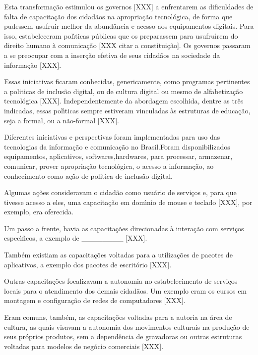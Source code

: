 \documentclass[
12pt,		%
openright,	%
twoside,  %
a4paper,			%
chapter=TITLE,		%
english,			%
french,				%
spanish,			%
brazil				%
]{USPSC-classe/USPSC}
\begin{document}
Esta transforma\c{c}\~ao estimulou os governos [XXX] a enfrentarem as dificuldades  de falta de  capacita\c{c}\~ao dos cidad\~aos na apropria\c{c}\~ao tecnol\'ogica, de forma que pudessem usufruir melhor da abund\^ancia e acesso aos equipamentos digitais. Para isso, estabeleceram pol\'{\i}ticas p\'ublicas que os preparassem para usufru\'{\i}rem do direito humano \`a comunica\c{c}\~ao [XXX citar a constitui\c{c}\~ao]. Os governos passaram a se preocupar com a inser\c{c}\~ao efetiva de seus cidad\~aos na sociedade da informa\c{c}\~ao [XXX].


Essas iniciativas ficaram conhecidas, genericamente, como programas pertinentes a politicas de \textquotedbl inclus\~ao digital, ou  de \textquotedbl cultura digital ou mesmo de \textquotedbl alfabetiza\c{c}\~ao tecnol\'ogica [XXX]. Independentemente da abordagem escolhida, dentre as tr\^es indicadas, essas pol\'{\i}ticas sempre estiveram vinculadas \`as estruturas de educa\c{c}\~ao, seja a formal, ou a n\~ao-formal [XXX].


Diferentes iniciativas e perspectivas foram implementadas para uso das tecnologias da informa\c{c}\~ao e comunica\c{c}\~ao no Brasil.Foram disponibilizados equipamentos, aplicativos, softwares,hardwares, para processar, armazenar, comunicar, prover apropria\c{c}\~ao tecnol\'ogica, o acesso a  informa\c{c}\~ao, ao conhecimento como a\c{c}\~ao de politica de inclus\~ao digital.


Algumas a\c{c}\~oes consideravam o cidad\~ao como usu\'ario de servi\c{c}os e, para que tivesse acesso a eles, uma capacita\c{c}\~ao em dom\'{\i}nio de mouse e teclado [XXX], por exemplo, era oferecida.


Um passo a frente, havia as capacita\c{c}\~oes direcionadas \`a intera\c{c}\~ao com servi\c{c}os espec\'{\i}ficos, a exemplo de \_\_\_\_\_\_\_\_ [XXX].


Tamb\'em existiam as capacita\c{c}\~oes voltadas para a utiliza\c{c}\~oes de pacotes de aplicativos, a exemplo dos pacotes de escrit\'orio [XXX].


Outras capacita\c{c}\~oes focalizavam a autonomia no estabelecimento de servi\c{c}os locais para o atendimento dos demais cidad\~aos. Um exemplo eram os cursos em montagem e configura\c{c}\~ao de redes de computadores [XXX].


Eram comuns, tamb\'em, as capacita\c{c}\~oes voltadas para a autoria na \'area de cultura, as quais visavam a autonomia dos movimentos culturais na produ\c{c}\~ao de seus pr\'oprios produtos, sem a depend\^encia de gravadoras ou outras estruturas voltadas para modelos de neg\'ocio comerciais [XXX].
\end{document}
